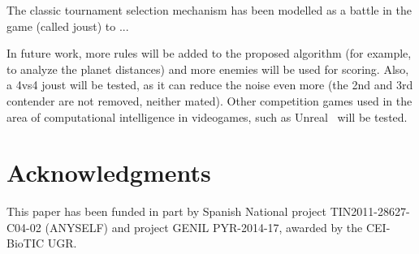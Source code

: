 \documentclass[conference]{IEEEtran}
\begin{document}
The classic tournament selection mechanism has been modelled as a battle in the game (called joust) to ...

In future work, more rules will be added to the proposed algorithm (for example, to analyze the planet distances) and more enemies will be used for scoring. Also, a 4vs4 joust will be tested, as it can reduce the noise even more (the 2nd and 3rd contender are not removed, neither mated). Other competition games used in the area of computational intelligence in videogames, such as Unreal\texttrademark~ will be tested.





\section{Acknowledgments}
This paper has been funded in part by Spanish National project TIN2011-28627-C04-02 (ANYSELF) and project GENIL PYR-2014-17, awarded by the CEI-BioTIC UGR.



\end{document}
